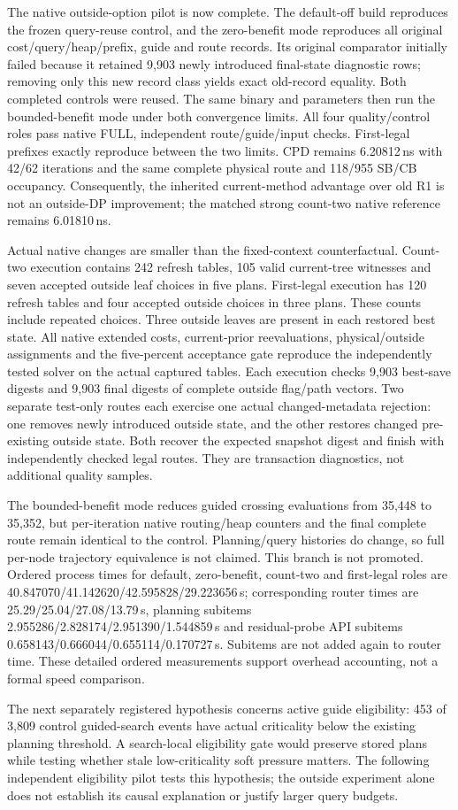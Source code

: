 The native outside-option pilot is now complete. The default-off build reproduces the frozen query-reuse control, and the zero-benefit mode reproduces all original cost/query/heap/prefix, guide and route records. Its original comparator initially failed because it retained 9,903 newly introduced final-state diagnostic rows; removing only this new record class yields exact old-record equality. Both completed controls were reused. The same binary and parameters then run the bounded-benefit mode under both convergence limits. All four quality/control roles pass native FULL, independent route/guide/input checks. First-legal prefixes exactly reproduce between the two limits. CPD remains 6.20812\,ns with 42/62 iterations and the same complete physical route and 118/955 SB/CB occupancy. Consequently, the inherited current-method advantage over old R1 is not an outside-DP improvement; the matched strong count-two native reference remains 6.01810\,ns.

Actual native changes are smaller than the fixed-context counterfactual. Count-two execution contains 242 refresh tables, 105 valid current-tree witnesses and seven accepted outside leaf choices in five plans. First-legal execution has 120 refresh tables and four accepted outside choices in three plans. These counts include repeated choices. Three outside leaves are present in each restored best state. All native extended costs, current-prior reevaluations, physical/outside assignments and the five-percent acceptance gate reproduce the independently tested solver on the actual captured tables. Each execution checks 9,903 best-save digests and 9,903 final digests of complete outside flag/path vectors. Two separate test-only routes each exercise one actual changed-metadata rejection: one removes newly introduced outside state, and the other restores changed pre-existing outside state. Both recover the expected snapshot digest and finish with independently checked legal routes. They are transaction diagnostics, not additional quality samples.

The bounded-benefit mode reduces guided crossing evaluations from 35,448 to 35,352, but per-iteration native routing/heap counters and the final complete route remain identical to the control. Planning/query histories do change, so full per-node trajectory equivalence is not claimed. This branch is not promoted. Ordered process times for default, zero-benefit, count-two and first-legal roles are 40.847070/41.142620/42.595828/29.223656\,s; corresponding router times are 25.29/25.04/27.08/13.79\,s, planning subitems 2.955286/2.828174/2.951390/1.544859\,s and residual-probe API subitems 0.658143/0.666044/0.655114/0.170727\,s. Subitems are not added again to router time. These detailed ordered measurements support overhead accounting, not a formal speed comparison.

The next separately registered hypothesis concerns active guide eligibility: 453 of 3,809 control guided-search events have actual criticality below the existing planning threshold. A search-local eligibility gate would preserve stored plans while testing whether stale low-criticality soft pressure matters. The following independent eligibility pilot tests this hypothesis; the outside experiment alone does not establish its causal explanation or justify larger query budgets.
